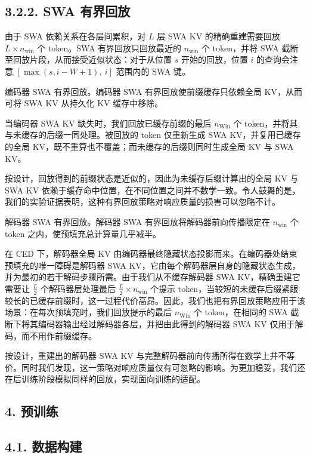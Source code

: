 \subsection{3.2.2. SWA 有界回放}\label{swa-bounded-replay}

由于 SWA 依赖关系在各层间累积，对 $L$ 层 SWA KV 的精确重建需要回放 \(L \times n _ { \mathrm { w i n } }\) 个 token。SWA 有界回放只回放最近的 \(n _ { \mathrm { { w i n } } }\) 个 token，并将 SWA 截断至回放片段，从而接受近似状态：对于从位置 $s$ 开始的回放，位置 $i$ 的查询会注意 $[\max(s, i - W + 1),\ i]$ 范围内的 SWA 键。

编码器 SWA 有界回放。编码器 SWA 有界回放使前缀缓存只依赖全局 KV，从而可将 SWA KV 从持久化 KV 缓存中移除。

当编码器 SWA KV 缺失时，我们回放已缓存前缀的最后 \(n _ { \mathrm { W i n } }\) 个 token，并将其与未缓存的后缀一同处理。被回放的 token 仅重新生成 SWA KV，并复用已缓存的全局 KV，既不重算也不覆盖；而未缓存的后缀则同时生成全局 KV 与 SWA KV。

按设计，回放得到的前缀状态是近似的，因此为未缓存后缀计算出的全局 KV 与 SWA KV 依赖于缓存命中位置，在不同位置之间并不数学一致。令人鼓舞的是，我们的实验证据表明，这种有界回放策略对响应质量的损害可以忽略不计。

解码器 SWA 有界回放。解码器 SWA 有界回放将解码器前向传播限定在 \(n _ { \mathrm { w i n } }\) 个 token 之内，使预填充总计算量几乎减半。

在 CED 下，解码器全局 KV 由编码器最终隐藏状态投影而来。在编码器处结束预填充的唯一障碍是解码器 SWA KV，它由每个解码器层自身的隐藏状态生成，并为最初的若干解码步骤所需。由于我们从不缓存解码器 SWA KV，精确重建它需要让 \(\frac { L } { 2 }\) 个解码器层处理最后 \(\frac { L } { 2 } \times n _ { \mathrm { w i n } }\) 个提示 token，当较短的未缓存后缀紧跟较长的已缓存前缀时，这一过程代价高昂。因此，我们也把有界回放策略应用于该场景：在每次预填充时，我们回放提示的最后 \(n _ { \mathrm { W i n } }\) 个 token，在相同的 SWA 截断下将其编码器输出经过解码器各层，并把由此得到的解码器 SWA KV 仅用于解码，而不用作前缀缓存。

按设计，重建出的解码器 SWA KV 与完整解码器前向传播所得在数学上并不等价。同时我们发现，这一策略对响应质量仅有可忽略的影响。为更加稳妥，我们还在后训练阶段模拟同样的回放，实现面向训练的适配。

\subsection{4. 预训练}\label{pre-training}

\subsection{4.1. 数据构建}\label{data-construction}

